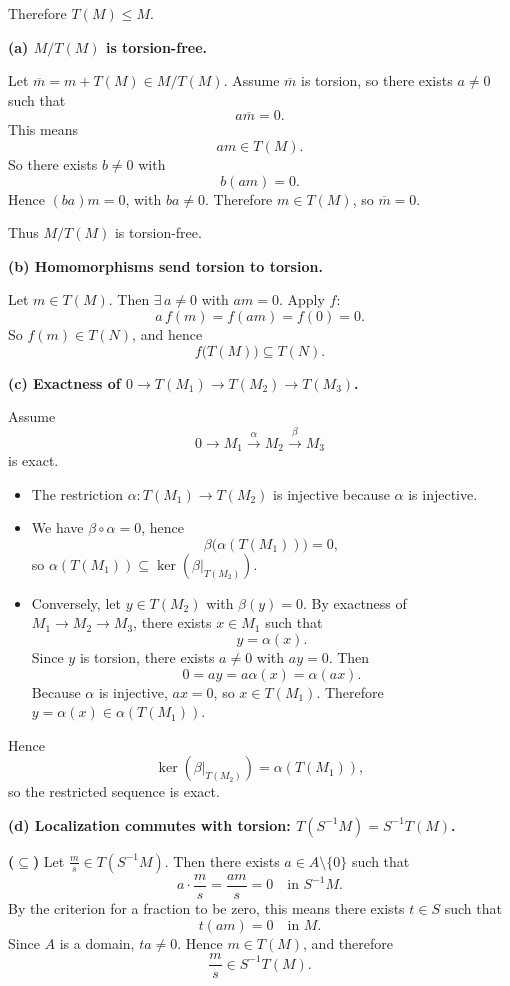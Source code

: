 \documentclass[12pt,a4paper]{article}
\theoremstyle{plain}
\theoremstyle{definition}      %
\begin{document}
Therefore \(T(M)\le M\).

\bigskip
\textbf{(a) \(M/T(M)\) is torsion-free.}

Let \(\overline{m}=m+T(M)\in M/T(M)\).
Assume \(\overline{m}\) is torsion, so there exists \(a\neq 0\) such that
\[
a\overline{m}=0.
\]
This means
\[
am\in T(M).
\]
So there exists \(b\neq 0\) with
\[
b(am)=0.
\]
Hence \((ba)m=0\), with \(ba\neq 0\). Therefore \(m\in T(M)\), so \(\overline{m}=0\).

Thus \(M/T(M)\) is torsion-free.

\bigskip
\textbf{(b) Homomorphisms send torsion to torsion.}

Let \(m\in T(M)\). Then \(\exists\,a\neq 0\) with \(am=0\).
Apply \(f\):
\[
a\,f(m)=f(am)=f(0)=0.
\]
So \(f(m)\in T(N)\), and hence
\[
f\bigl(T(M)\bigr)\subseteq T(N).
\]

\bigskip
\textbf{(c) Exactness of \(0\to T(M_1)\to T(M_2)\to T(M_3)\).}

Assume
\[
0\longrightarrow M_{1}\xrightarrow{\ \alpha\ } M_{2}\xrightarrow{\ \beta\ } M_{3}
\]
is exact.

\begin{itemize}
	\item The restriction \(\alpha:T(M_1)\to T(M_2)\) is injective because \(\alpha\) is injective.
	
	\item We have \(\beta\circ\alpha=0\), hence
	\[
	\beta\bigl(\alpha(T(M_1))\bigr)=0,
	\]
	so \(\alpha(T(M_1))\subseteq \ker(\beta|_{T(M_2)}).\)
	
	\item Conversely, let \(y\in T(M_2)\) with \(\beta(y)=0\).
	By exactness of \(M_1\to M_2\to M_3\), there exists \(x\in M_1\) such that
	\[
	y=\alpha(x).
	\]
	Since \(y\) is torsion, there exists \(a\neq 0\) with \(ay=0\). Then
	\[
	0=ay=a\alpha(x)=\alpha(ax).
	\]
	Because \(\alpha\) is injective, \(ax=0\), so \(x\in T(M_1)\).
	Therefore \(y=\alpha(x)\in \alpha(T(M_1))\).
\end{itemize}

Hence
\[
\ker(\beta|_{T(M_2)})=\alpha(T(M_1)),
\]
so the restricted sequence is exact.

\bigskip
\textbf{(d) Localization commutes with torsion: \(T(S^{-1}M)=S^{-1}T(M)\).}

\textbf{(\(\subseteq\))} Let \(\frac{m}{s}\in T(S^{-1}M)\).
Then there exists \(a\in A\setminus\{0\}\) such that
\[
a\cdot \frac{m}{s}=\frac{am}{s}=0\quad\text{in }S^{-1}M.
\]
By the criterion for a fraction to be zero, this means there exists \(t\in S\) such that
\[
t(am)=0\quad\text{in }M.
\]
Since \(A\) is a domain, \(ta\neq 0\). Hence \(m\in T(M)\), and therefore
\[
\frac{m}{s}\in S^{-1}T(M).
\]
\end{document}
